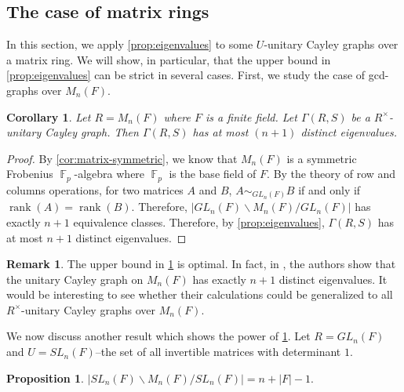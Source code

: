 \documentclass[12pt, a4paper]{amsart}
\newtheorem{prop}[thm]{Proposition}
\newtheorem{cor}[thm]{Corollary}
\theoremstyle{definition}
\newtheorem{rem}[thm]{Remark}
\DeclareMathOperator{\F}{\mathbb{F}}
\DeclareMathOperator{\rank}{\text{rank}}
\numberwithin{equation}{section}
\begin{document}
\subsection{The case of matrix rings}
In this section, we apply \cref{prop:eigenvalues} to some $U$-unitary Cayley graphs over a matrix ring. We will show, in particular, that the upper bound in \cref{prop:eigenvalues} can be strict in several cases. First, we study the case of gcd-graphs over $M_n(F).$
\begin{cor} \label{cor:number-of-eigs-matrix}
Let $R=M_n(F)$ where $F$ is a finite field.  Let $\Gamma(R,S)$ be a $R^{\times}$-unitary Cayley graph. Then $\Gamma(R,S)$ has at most  $(n+1)$ distinct eigenvalues. 
\end{cor}
\begin{proof}
By \cref{cor:matrix-symmetric}, we know that $M_n(F)$ is a symmetric Frobenius $\F_p$-algebra where $\F_p$ is the base field of $F.$  By the theory of row and columns operations, for two matrices $A$ and $B$, $A \sim_{GL_n(F)} B$ if and only if $\rank(A)=\rank(B).$ Therefore, $|GL_n(F) \backslash M_n(F) \slash GL_n(F)|$ has exactly $n+1$ equivalence classes. Therefore, by \cref{prop:eigenvalues}, $\Gamma(R,S)$ has at most $n+1$ distinct eigenvalues. 
\end{proof}
\begin{rem}
    The upper bound in \cref{cor:number-of-eigs-matrix} is optimal. In fact, in \cite[Theorem 1.1]{chen2022unitary}, the authors show that the unitary Cayley graph on $M_n(F)$ has exactly $n+1$ distinct eigenvalues. It would be interesting to see whether their calculations could be generalized to all $R^{\times}$-unitary Cayley graphs over $M_n(F).$
\end{rem}
We now discuss another result which shows the power of \cref{cor:number-of-eigs-matrix}. Let $R=GL_n(F)$ and $U=SL_n(F)$--the set of all invertible matrices with determinant $1.$
\begin{prop} \label{prop:similar-sln}
    $|SL_n(F) \backslash M_n(F) \slash SL_n(F)|=n+|F|-1.$
\end{prop}
\end{document}
